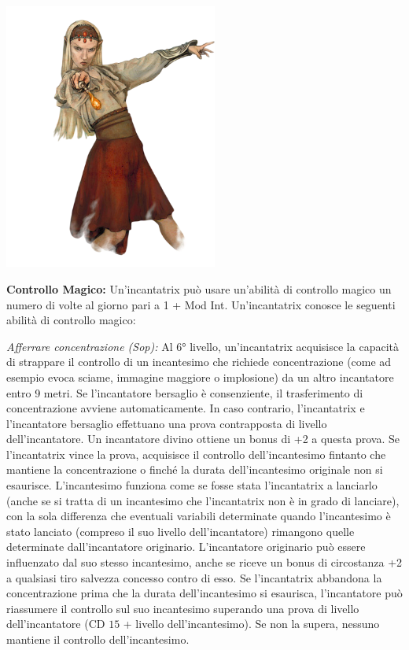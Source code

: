 \documentclass[10pt, a4paper]{report}
\begin{document}
\begin{multicols}{2}
\includegraphics[width=7cm]{incantatrix.png}

\textbf{Controllo Magico:} Un'incantatrix può usare un'abilità di controllo magico un numero di volte al giorno pari a 1 + Mod Int. Un'incantatrix conosce le seguenti abilità di controllo magico:

\textit{Afferrare concentrazione (Sop):} Al 6° livello, un'incantatrix acquisisce la capacità di strappare il controllo di un incantesimo che richiede concentrazione (come ad esempio evoca sciame, immagine maggiore o implosione) da un altro incantatore entro 9 metri. Se l'incantatore bersaglio è consenziente, il trasferimento di concentrazione avviene automaticamente. In caso contrario, l'incantatrix e l'incantatore bersaglio effettuano una prova contrapposta di livello dell'incantatore. Un incantatore divino ottiene un bonus di +2 a questa prova. Se l'incantatrix vince la prova, acquisisce il controllo dell'incantesimo fintanto che mantiene la concentrazione o finché la durata dell'incantesimo originale non si esaurisce. L'incantesimo funziona come se fosse stata l'incantatrix a lanciarlo (anche se si tratta di un incantesimo che l'incantatrix non è in grado di lanciare), con la sola differenza che eventuali variabili determinate quando l'incantesimo è stato lanciato (compreso il suo livello dell'incantatore) rimangono quelle determinate dall'incantatore originario. L'incantatore originario può essere influenzato dal suo stesso incantesimo, anche se riceve un bonus di circostanza +2 a qualsiasi tiro salvezza concesso contro di esso. Se l'incantatrix abbandona la concentrazione prima che la durata dell'incantesimo si esaurisca, l'incantatore può riassumere il controllo sul suo incantesimo superando una prova di livello dell'incantatore (CD $15$ + livello dell'incantesimo). Se non la supera, nessuno mantiene il controllo dell'incantesimo.


\end{multicols}
\end{document}
